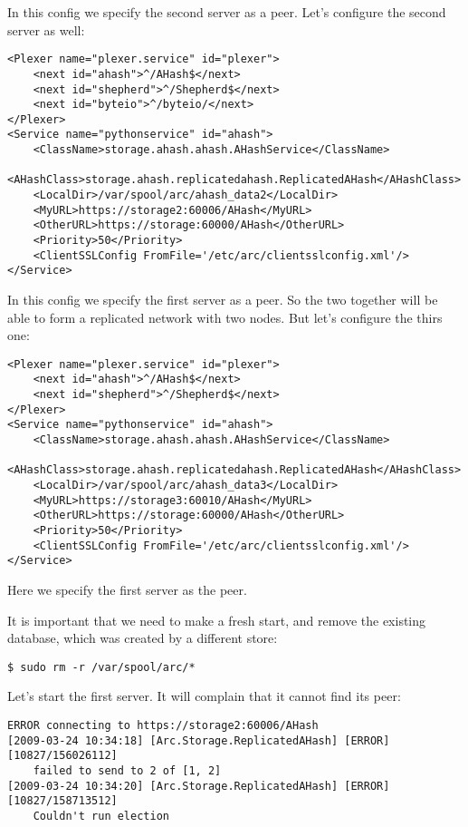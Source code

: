 \documentclass{book}
\begin{document}
In this config we specify the second server as a peer. Let's configure the second server as well:

\begin{verbatim}
<Plexer name="plexer.service" id="plexer">
    <next id="ahash">^/AHash$</next>
    <next id="shepherd">^/Shepherd$</next>
    <next id="byteio">^/byteio/</next>
</Plexer>
<Service name="pythonservice" id="ahash">
    <ClassName>storage.ahash.ahash.AHashService</ClassName>
    <AHashClass>storage.ahash.replicatedahash.ReplicatedAHash</AHashClass>
    <LocalDir>/var/spool/arc/ahash_data2</LocalDir>
    <MyURL>https://storage2:60006/AHash</MyURL>
    <OtherURL>https://storage:60000/AHash</OtherURL>
    <Priority>50</Priority>
    <ClientSSLConfig FromFile='/etc/arc/clientsslconfig.xml'/>
</Service>
\end{verbatim}

In this config we specify the first server as a peer. So the two together will be able to form a replicated network with two nodes. But let's configure the thirs one:

\begin{verbatim}
<Plexer name="plexer.service" id="plexer">
    <next id="ahash">^/AHash$</next>
    <next id="shepherd">^/Shepherd$</next>
</Plexer>
<Service name="pythonservice" id="ahash">
    <ClassName>storage.ahash.ahash.AHashService</ClassName>
    <AHashClass>storage.ahash.replicatedahash.ReplicatedAHash</AHashClass>
    <LocalDir>/var/spool/arc/ahash_data3</LocalDir>
    <MyURL>https://storage3:60010/AHash</MyURL>
    <OtherURL>https://storage:60000/AHash</OtherURL>
    <Priority>50</Priority>
    <ClientSSLConfig FromFile='/etc/arc/clientsslconfig.xml'/>
</Service>
\end{verbatim}

Here we specify the first server as the peer.

It is important that we need to make a fresh start, and remove the existing database, which was created by a different store:
\begin{verbatim}
$ sudo rm -r /var/spool/arc/*
\end{verbatim}

Let's start the first server. It will complain that it cannot find its peer:
\begin{verbatim}
ERROR connecting to https://storage2:60006/AHash
[2009-03-24 10:34:18] [Arc.Storage.ReplicatedAHash] [ERROR] [10827/156026112]
    failed to send to 2 of [1, 2]
[2009-03-24 10:34:20] [Arc.Storage.ReplicatedAHash] [ERROR] [10827/158713512]
    Couldn't run election
\end{verbatim}
\end{document}
